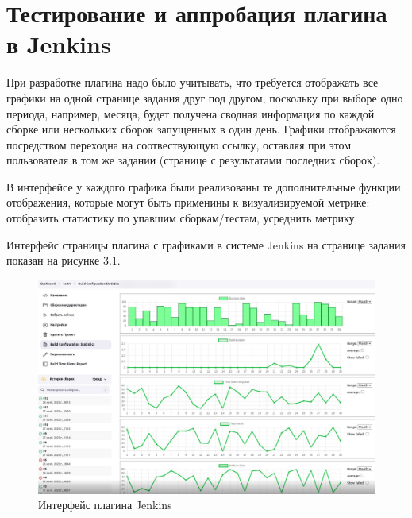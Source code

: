 \chapter{Тестирование и аппробация плагина в Jenkins} \label{ch4}


При разработке плагина надо было учитывать, что требуется отображать все графики на одной странице задания друг под другом, поскольку при выборе одно периода, например, месяца, будет получена сводная информация по каждой сборке или нескольких сборок запущенных в один день. Графики отображаются посредством переходна на соотвествующую ссылку, оставляя при этом пользователя в том же задании (странице с результатами последних сборок).

В интерфейсе у каждого графика были реализованы те дополнительные функции отображения, которые могут быть применины к визуализируемой метрике: отобразить статистику по упавшим сборкам/тестам, усреднить метрику.

Интерфейс страницы плагина с графиками в системе Jenkins на странице задания показан на рисунке 3.1.


\begin{figure}[ht!] 
	\center
	\includegraphics [scale=0.47] {my_folder/images//ui}
	\caption{Интерфейс плагина Jenkins} 
	\label{fig:ArchitectureJenkins}  
\end{figure}

